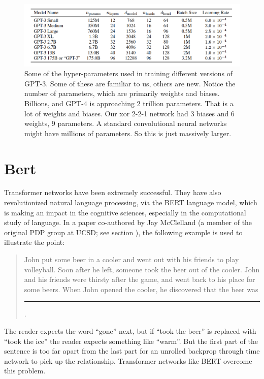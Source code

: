 \begin{figure}[h]
\centering
\includegraphics[scale=.4]{./images/gpt3_params.png}
\caption[GPT Technical report. Todo]{Some of the hyper-parameters used in training different versions of GPT-3. Some of these are familiar to us, others are new. Notice the number of parameters, which are primarily weights and biases.  Billions, and GPT-4 is approaching 2 trillion parameters.  That is a lot of weights and biases.  Our xor 2-2-1 network had 3 biases and 6 weights, 9 parameters.  A standard convolutional neural networks might have millions of parameters. So this is just massively larger. }
\label{gptParams}
\end{figure}

\section{Bert}\label{sect_bert}

Transformer networks have been extremely successful. They have also revolutionized natural language processing, via the BERT language model, which is making an impact in the cognitive sciences, especially in the computational study of language. In a paper co-authored by Jay McClelland  \cite{mcclelland2020placing} (a member of the original PDP group at UCSD; see section ), the following example is used to illustrate the point:
\begin{quote}
John put some beer in a cooler and went out with his friends to play volleyball. Soon after he left, someone took the beer out of the cooler. John and his friends were thirsty after the game, and went back to his place for some beers. When John opened the cooler, he discovered that the beer was \rule{1cm}{0.15mm}.
\end{quote}
The reader expects the word ``gone'' next, but if ``took the beer'' is replaced with ``took the ice'' the reader expects something like ``warm''. But the first part of the sentence is too far apart from the last part for an unrolled backprop through time network to pick up the relationship.  Transformer networks like BERT overcome this problem.

